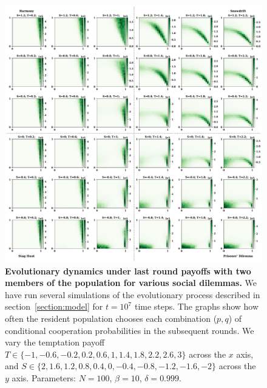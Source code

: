 \documentclass[11pt]{article}
\theoremstyle{plainCl1}
\theoremstyle{plainCl2}
\begin{document}
\begin{figure}[!htbp]
  \centering
  \includegraphics[width=\textwidth]{static/opponents_two_by_two_games.pdf}
  \caption{{\bf Evolutionary dynamics under last round payoffs with two members of the population for various social dilemmas.} 
  We have run several simulations of the evolutionary process described in
  section~\ref{section:model} for $t\!=\!10^7$ time steps. The graphs show how
  often the resident population chooses each combination ($p,q$) of conditional
  cooperation probabilities in the subsequent rounds. We vary the temptation
  payoff \(T \in \{-1, -0.6, -0.2,  0.2, 0.6, 1, 1.4, 1.8, 2.2, 2.6, 3\}\)
  across the \(x\) axis, and  \(S \in \{2, 1.6, 1.2, 0.8, 0.4, 0, -0.4, -0.8,
  -1.2, -1.6, -2\}\) across the \(y\) axis. Parameters: $N\!=\!100$,
  $\beta\!=\!10$, $\delta\!=\!0.999$.}
  \label{fig:last_two_opponents_two_by_two}
\end{figure}
\end{document}
